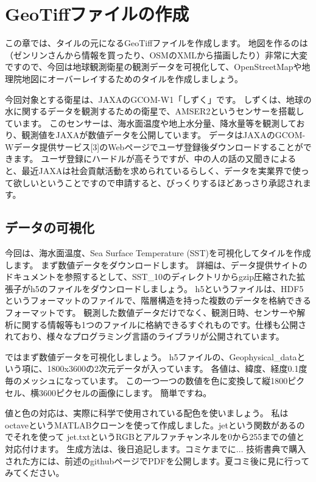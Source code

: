 \chapter*{GeoTiffファイルの作成}

この章では、タイルの元になるGeoTiffファイルを作成します。
地図を作るのは（ゼンリンさんから情報を買ったり、OSMのXMLから描画したり）非常に大変ですので、今回は地球観測衛星の観測データを可視化して、OpenStreetMapや地理院地図にオーバーレイするためのタイルを作成しましょう。

今回対象とする衛星は、JAXAのGCOM-W1「しずく」です。
しずくは、地球の水に関するデータを観測するための衛星で、AMSER2というセンサーを搭載しています。
このセンサーは、海水面温度や地上水分量、降水量等を観測しており、観測値をJAXAが数値データを公開しています。
データはJAXAのGCOM-Wデータ提供サービス[3]のWebページでユーザ登録後ダウンロードすることができます。
ユーザ登録にハードルが高そうですが、中の人の話の又聞きによると、最近JAXAは社会貢献活動を求められているらしく、データを実業界で使って欲しいということですので申請すると、びっくりするほどあっさり承認されます。

\section*{データの可視化}
今回は、海水面温度、Sea Surface Temperature (SST)を可視化してタイルを作成します。
まず数値データをダウンロードします。
詳細は、データ提供サイトのドキュメントを参照するとして、SST\_10のディレクトリからgzip圧縮された拡張子がh5のファイルをダウンロードしましょう。
h5というファイルは、HDF5というフォーマットのファイルで、階層構造を持った複数のデータを格納できるフォーマットです。
観測した数値データだけでなく、観測日時、センサーや解析に関する情報等も1つのファイルに格納できるすぐれものです。仕様も公開されており、様々なプログラミング言語のライブラリが公開されています。

ではまず数値データを可視化しましょう。
h5ファイルの、Geophysical\_dataという項に、1800x3600の2次元データが入っています。
各値は、緯度、経度0.1度毎のメッシュになっています。
この一つ一つの数値を色に変換して縦1800ピクセル、横3600ピクセルの画像にします。
簡単ですね。

値と色の対応は、実際に科学で使用されている配色を使いましょう。
私はoctaveというMATLABクローンを使って作成しました。jetという関数があるのでそれを使って
jet.txtというRGBとアルファチャンネルを0から255までの値と対応付けます。
生成方法は、後日追記します。コミケまでに...
技術書典で購入された方には、前述のgithubページでPDFを公開します。夏コミ後に見に行ってみてください。

